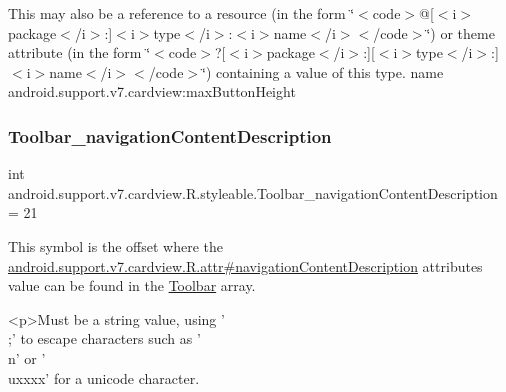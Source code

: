This may also be a reference to a resource (in the form \char`\"{}$<$code$>$@\mbox{[}$<$i$>$package$<$/i$>$\+:\mbox{]}$<$i$>$type$<$/i$>$\+:$<$i$>$name$<$/i$>$$<$/code$>$\char`\"{}) or theme attribute (in the form \char`\"{}$<$code$>$?\mbox{[}$<$i$>$package$<$/i$>$\+:\mbox{]}\mbox{[}$<$i$>$type$<$/i$>$\+:\mbox{]}$<$i$>$name$<$/i$>$$<$/code$>$\char`\"{}) containing a value of this type.  name android.\+support.\+v7.\+cardview\+:max\+Button\+Height \mbox{\label{classandroid_1_1support_1_1v7_1_1cardview_1_1R_1_1styleable_a1530a92c6708dc96b49416ed9e722bc5}} 
\subsubsection{\texorpdfstring{Toolbar\+\_\+navigation\+Content\+Description}{Toolbar\_navigationContentDescription}}
{\footnotesize\ttfamily int android.\+support.\+v7.\+cardview.\+R.\+styleable.\+Toolbar\+\_\+navigation\+Content\+Description = 21\hspace{0.3cm}{\ttfamily [static]}}

This symbol is the offset where the \hyperlink{classandroid_1_1support_1_1v7_1_1cardview_1_1R_1_1attr_af2cce7ed6eca186ae590d5969dfdb847}{android.\+support.\+v7.\+cardview.\+R.\+attr\#navigation\+Content\+Description} attribute\textquotesingle{}s value can be found in the \hyperlink{classandroid_1_1support_1_1v7_1_1cardview_1_1R_1_1styleable_a26149aeb8fd339abe09ecc9d92b9304f}{Toolbar} array.

\begin{DoxyVerb}      <p>Must be a string value, using '\\;' to escape characters such as '\\n' or '\\uxxxx' for a unicode character.
\end{DoxyVerb}
 

